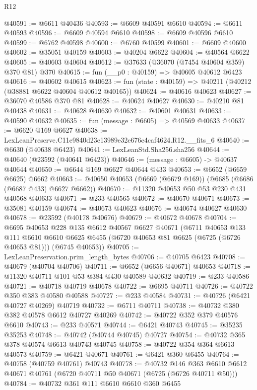 \begin{lexlean}{R12}
\begin{coremodule}
@40591 := @6611 @40436
@40593 := @6609 @40591 @6610
@40594 := @6611 @40593
@40596 := @6609 @40594 @6610
@40598 := @6609 @40596 @6610
@40599 := @6762 @40598
@40600 := @6760 @40599
@40601 := @6609 @40600
@40602 := @35051 @40159
@40603 := @40204 @6622
@40604 := @40564 @6622
@40605 := @40603 @40604
@40612 := @37633 (@36070 (@7454 @40604 @359) @370 @81) @370
@40615 := fun (__p0 : @40159) => @40605 @40612 @6423
@40616 := @40602 @40615
@40623 := fun (state : @40159) => @40211 (@40212 (@38881 @6622 @40604 @40612 @40165))
@40624 := @40616 @40623
@40627 := @36070 @40586 @370 @81
@40628 := @40624 @40627
@40630 := @40210 @81 @40438
@40631 := @40628 @40630
@40632 := @40601 @40631
@40633 := @40590 @40632
@40635 := fun (message : @6605) => @40569 @40633
@40637 := @6620 @169 @6627
@40638 := LexLeanPreserve.C11e9840d23e13989e32e676c4caf4624.R12.__fits_6
@40640 := @6630 (@40638 @6423)
@40641 := LexLeanStd.Sha256.sha256
@40644 := @40640 (@23592 (@40641 @6423))
@40646 := (message : @6605) -> @40637 @40644
@40650 := @6644 @169 @6627 @40644 @433
@40653 := @6652 (@6659 @6625) @6662
@40663 := @40650 @40653 (@6669 (@6679 @169)) (@6685 (@6686 (@6687 @433) @6627 @6662))
@40670 := @11320 @40653 @50 @53 @230 @431 @40568 @40633
@40671 := @233 @40565
@40672 := @40670 @40671
@40673 := @35081 @40159
@40674 := @40673 @40623
@40676 := @40674 @40627 @40630
@40678 := @23592 (@40178 @40676)
@40679 := @40672 @40678
@40704 := @6695
    @40653
    @228
    @135
    @6612
    @40567
    @6627
    @40671
    (@6711
      @40653
      @133
      @111
      @6610
      @6610
      @6625
      @6455
      (@6720 @40653 @81 @6625 (@6725 (@6726 @40653 @81)))
      (@6745 @40653))
@40705 := LexLeanPreservation.prim_length_bytes
@40706 := @40705 @6423
@40708 := @40679 (@40704 @40706)
@40711 := @6652 (@6656 @40671) @40653
@40718 := @11320 @40711 @101 @53 @384 @430 @40589 @40632
@40719 := @233 @40586
@40721 := @40718 @40719 @40678
@40722 := @6695 @40711
@40726 := @40722 @350 @383 @40580 @40588
@40727 := @233 @40584
@40731 := @40726 (@6421 @40727 @40269) @40719
@40732 := @6711 @40711
@40738 := @40732 @380 @382 @40578 @6612 @40727 @40269
@40742 := @40722 @352 @379 @40576 @6610
@40743 := @233 @40571
@40744 := @6421 @40743
@40745 := @35235 @35253
@40748 := @40742 (@40744 @40745) @40727
@40754 := @40732 @365 @378 @40574 @6613 @40743 @40745
@40758 := @40722 @354 @364 @6613 @40573
@40759 := @6421 @40671
@40761 := @6421 @360 @6455
@40764 := @40758 (@40759 @40761) @40743
@40778 := @40732
    @146
    @363
    @6610
    @6612
    @40671
    @40761
    (@6720 @40711 @50 @40671 (@6725 (@6726 @40711 @50)))
@40784 := @40732 @361 @111 @6610 @6610 @360 @6455

\end{coremodule}
\end{lexlean}
